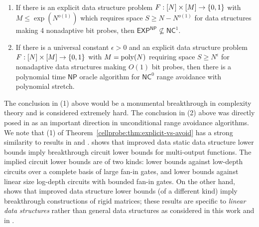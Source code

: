 % 
\begin{theorem}
~
\begin{enumerate}
    \item If there is an explicit data structure problem $F:[N] \times [M] \to \{0,1\}$ with $M \leq \exp(N^{o(1)})$ which requires space $S \geq N - N^{o(1)}$ for data structures making 4 nonadaptive bit probes, then $\mathsf{EXP^{NP}} \not\subseteq \mathsf{NC}^1$.
    \item If there is a universal constant $\epsilon>0$ and an explicit data structure problem $F:[N] \times [M] \to \{0,1\}$ with $M = \mathrm{poly}(N)$ requiring space $S \geq N^{\epsilon}$ for nonadaptive data structures making $O(1)$ bit probes, then there is a polynomial time $\mathsf{NP}$ oracle algorithm for $\mathsf{NC}^0$ range avoidance with polynomial stretch.
\end{enumerate}
\end{theorem}

The conclusion in (1) above would be a monumental breakthrough in complexity theory and is considered extremely hard. The conclusion in (2) above was directly posed in \cite{RSW} as an important direction in unconditional range avoidance algorithms.
We note that (1) of Theorem~\ref{cellprobe:thm:explicit-vs-avoid} has a strong similarity to results in \cite{viola-maximal} and \cite{omri}. \cite{viola-maximal} shows that improved data static data structure lower bounds imply breakthrough circuit lower bounds for multi-output functions. The implied circuit lower bounds are of two kinds: lower bounds against low-depth circuits over a complete basis of large fan-in gates, and lower bounds against linear size log-depth circuits with bounded fan-in gates. 
On the other hand, \cite{omri} shows that improved data structure lower bounds (of a different kind) imply breakthrough constructions of rigid matrices; these results are specific to \emph{linear data structures} rather than general data structures as considered in this work and in \cite{viola-maximal}. 

